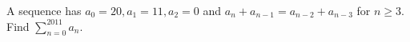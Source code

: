 A sequence has $a_0=20,a_1=11,a_2=0$ and $a_n+a_{n-1}=a_{n-2}+a_{n-3}$ for $n\ge3$. Find $\sum_{n=0}^{2011}a_n$.
